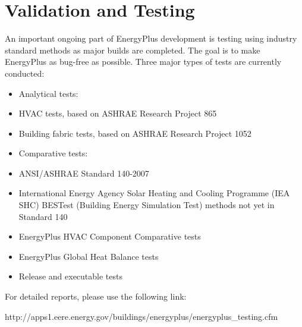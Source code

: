 \chapter{Validation and Testing}\label{validation-and-testing}

An important ongoing part of EnergyPlus development is testing using industry standard methods as major builds are completed. The goal is to make EnergyPlus as bug-free as possible. Three major types of tests are currently conducted:

\begin{itemize}
\item
  Analytical tests:
\item
  HVAC tests, based on ASHRAE Research Project 865
\item
  Building fabric tests, based on ASHRAE Research Project 1052
\item
  Comparative tests:
\item
  ANSI/ASHRAE Standard 140-2007
\item
  International Energy Agency Solar Heating and Cooling Programme (IEA SHC) BESTest (Building Energy Simulation Test) methods not yet in Standard 140
\item
  EnergyPlus HVAC Component Comparative tests
\item
  EnergyPlus Global Heat Balance tests
\item
  Release and executable tests
\end{itemize}

For detailed reports, please use the following link:

http://apps1.eere.energy.gov/buildings/energyplus/energyplus\_testing.cfm

